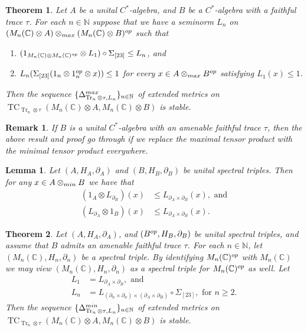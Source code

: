 \documentclass[10pt,a4paper]{amsart}
\newtheorem{theorem}{Theorem}
\newtheorem{remark}{Remark}
\newtheorem{lemma}{Lemma}
\newcommand{\TC}{\operatorname{TC}}
\newcommand{\Tr}{\operatorname{Tr}}
\newcommand{\bbC}{\mathbb{C}}
\newcommand{\bbN}{\mathbb{N}}
\begin{document}
\begin{theorem}\label{thm:stability 1}
    Let $A$ be a unital $C^*$-algebra, and $B$ be a $C^*$-algebra with a faithful trace $\tau$. For each $n \in \bbN$ suppose that we have a seminorm $L_n$ on $(M_n(\bbC) \otimes A) \otimes_{\rm max} (M_n(\bbC) \otimes B)^{\rm op}$ such that
    \begin{enumerate}
        \item $(1_{M_n(\bbC) \otimes M_n(\bbC)^{\rm op}} \otimes L_1) \circ \Sigma_{[23]} \leq L_n$, and
        \item $L_n(\Sigma_{[23]}(1_n \otimes 1_n^{\rm op} \otimes x)) \leq 1$ for every $x \in A \otimes_{\rm max} B^{\rm op}$ satisfying $L_1(x) \leq 1$.
    \end{enumerate}
    Then the sequence $\{\Delta_{\Tr_n \otimes \tau, L_n}^{\rm max}\}_{n \in \bbN}$ of extended metrics on $\TC_{\Tr_n \otimes \tau} (M_n (\bbC) \otimes A , M_n(\bbC) \otimes B)$ is stable.
\end{theorem}

\begin{remark}\label{rem:stability for spatial norm}
    If $B$ is a unital $C^*$-algebra with an amenable faithful trace $\tau$, then the above result and proof go through if we replace the maximal tensor product with the minimal tensor product everywhere.
\end{remark}

\begin{lemma}\label{thm:spectral triples Kaad}
    Let $(A,H_A,\partial_A)$ and $(B,H_B,\partial_B)$ be unital spectral triples. Then for any $x \in A \otimes_{\rm min} B$ we have that
    \begin{align*}
        (1_A \otimes L_{\partial_B})(x) & \leq L_{\partial_A \times \partial_B}(x), \text{ and} \\
        (L_{\partial_A} \otimes 1_B)(x) & \leq L_{\partial_A \times \partial_B}(x).
    \end{align*}
\end{lemma}

\begin{theorem}\label{thm:stability 2}
    Let $(A,H_A,\partial_A)$, and $(B^{\rm op},H_B,\partial_B)$ be unital spectral triples, and assume that $B$ admits an amenable faithful trace $\tau$. For each $n \in \bbN$, let $(M_n(\bbC),H_n,\partial_n)$ be a spectral triple. By identifying $M_n(\bbC)^{\rm op}$ with $M_n(\bbC)$ we may view $(M_n(\bbC),H_n,\partial_n)$ as a spectral triple for $M_n(\bbC)^{\rm op}$ as well. Let
    \begin{align*}
        L_1 & = L_{\partial_A \times \partial_B}, \text{ and } \\
        L_n & = L_{(\partial_n \times \partial_n) \times (\partial_A \times \partial_B)} \circ \Sigma_{[23]}, \text{ for } n \geq 2.
    \end{align*}
    Then the sequence $\{\Delta_{\Tr_n \otimes \tau, L_n}^{\rm min}\}_{n \in \bbN}$ of extended metrics on $\TC_{\Tr_n \otimes \tau}(M_n(\bbC) \otimes A, M_n(\bbC) \otimes B)$ is stable.
\end{theorem}
\end{document}
